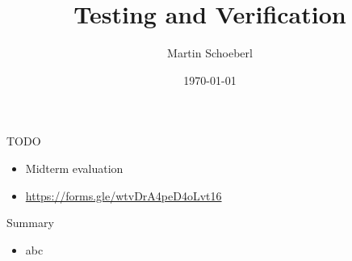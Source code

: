 

\newif\ifbook


\title{Testing and Verification}
\author{Martin Schoeberl}
\date{\today}



\begin{frame}
\titlepage
\end{frame}


\begin{frame}[fragile]{TODO}
\begin{itemize}
\item Midterm evaluation
\item \url{https://forms.gle/wtvDrA4peD4oLvt16}
\end{itemize}
\end{frame}





\begin{frame}[fragile]{Summary}
\begin{itemize}
\item abc
\end{itemize}
\end{frame}
